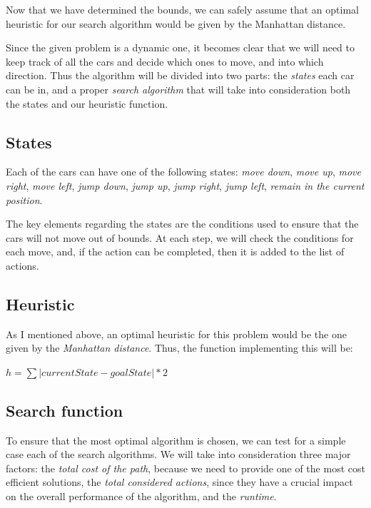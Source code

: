 \documentclass{article}
\begin{document}
Now that we have determined the bounds, we can safely assume that an optimal heuristic for our search algorithm would be given by the Manhattan distance.


Since the given problem is a dynamic one, it becomes clear that we will need to keep track of all the cars and decide which ones to move, and into which direction. Thus the algorithm will be divided into two parts: the \emph{states} each car can be in, and a proper \emph{search algorithm} that will take into consideration both the states and our heuristic function.


\subsection{States}
\label{states}
Each of the cars can have one of the following states: \emph{move down}, \emph{move up}, \emph{move right}, \emph{move left}, \emph{jump down}, \emph{jump up}, \emph{jump right}, \emph{jump left}, \emph{remain in the current position}.

The key elements regarding the states are the conditions used to ensure that the cars will not move out of bounds. At each step, we will check the conditions for each move, and, if the action can be completed, then it is added to the list of actions.

\subsection{Heuristic}
As I mentioned above, an optimal heuristic for this problem would be the one given by the \emph{Manhattan distance}. Thus, the function implementing this will be:

\begin{center}
    $h = \sum \vert currentState - goalState \vert * 2$
\end{center}

\subsection{Search function}
\label{search_function}

To ensure that the most optimal algorithm is chosen, we can test for a simple case each of the search algorithms. We will take into consideration three major factors: the \emph{total cost of the path}, because we need to provide one of the most cost efficient solutions, the \emph{total considered actions}, since they have a crucial impact on the overall performance of the algorithm, and the \emph{runtime}. 
\end{document}
